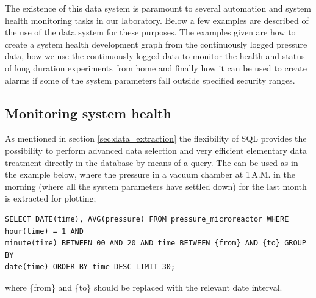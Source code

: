 The existence of this data system is paramount to several automation and system
health monitoring tasks in our laboratory. Below a few examples are described
of the use of the data system for these purposes. The examples given are how to
create a system health development graph from the continuously logged pressure
data, how we use the continuously logged data to monitor the health and status
of long duration experiments from home and finally how it can be used to create
alarms if some of the system parameters fall outside specified security ranges.

\subsection{Monitoring system health}
\label{sec:morning_pressure}
As mentioned in section \ref{sec:data_extraction} the flexibility of SQL
provides the possibility to perform advanced data selection and very efficient
elementary data treatment directly in the database by means of a query.
The can be used as in the example below, where the pressure in a vacuum
chamber at 1\,A.M. in the morning (where all the system parameters have settled
down) for the last month is extracted for plotting; 

\begin{verbatim} 
SELECT DATE(time), AVG(pressure) FROM pressure_microreactor WHERE hour(time) = 1 AND
minute(time) BETWEEN 00 AND 20 AND time BETWEEN {from} AND {to} GROUP BY
date(time) ORDER BY time DESC LIMIT 30; \end{verbatim} 

where \{from\} and \{to\} should be replaced with the relevant date interval.


